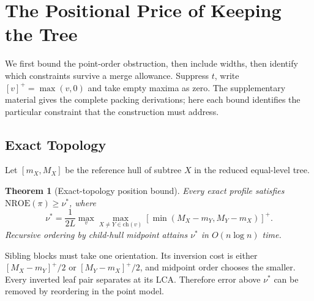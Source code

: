 \documentclass[review]{vgtc}
\newtheorem{theorem}{Theorem}
\newcommand{\nroe}{\mathrm{NROE}}
\begin{document}
\section{The Positional Price of Keeping the Tree}\label{sec:bounds}
We first bound the point-order obstruction, then include widths, then identify which constraints survive a merge allowance. Suppress $t$, write $[v]^+=\max(v,0)$ and take empty maxima as zero. The supplementary material gives the complete packing derivations; here each bound identifies the particular constraint that the construction must address.

\subsection{Exact Topology}
Let $[m_X,M_X]$ be the reference hull of subtree $X$ in the reduced equal-level tree.
\begin{theorem}[Exact-topology position bound]\label{thm:order}
Every exact profile satisfies $\nroe(\pi)\ge\nu^*$, where
\begin{equation}\label{eq:nu}
\nu^*=\frac{1}{2L}\max_v\max_{X\ne Y\in\mathrm{ch}(v)}[\min(M_X-m_Y,M_Y-m_X)]^+.
\end{equation}
Recursive ordering by child-hull midpoint attains $\nu^*$ in $O(n\log n)$ time.
\end{theorem}
Sibling blocks must take one orientation. Its inversion cost is either $[M_X-m_Y]^+/2$ or $[M_Y-m_X]^+/2$, and midpoint order chooses the smaller. Every inverted leaf pair separates at its LCA. Therefore error above $\nu^*$ can be removed by reordering in the point model.
\end{document}
